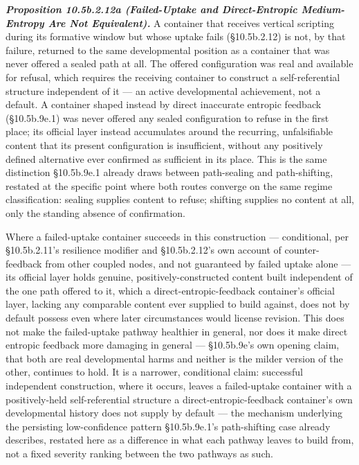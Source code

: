 \documentclass[
]{article}
\begin{document}
\emph{\textbf{Proposition 10.5b.2.12a (Failed-Uptake and Direct-Entropic
Medium-Entropy Are Not Equivalent).}} A container that receives vertical
scripting during its formative window but whose uptake fails
(§10.5b.2.12) is not, by that failure, returned to the same
developmental position as a container that was never offered a sealed
path at all. The offered configuration was real and available for
refusal, which requires the receiving container to construct a
self-referential structure independent of it --- an active developmental
achievement, not a default. A container shaped instead by direct
inaccurate entropic feedback (§10.5b.9e.1) was never offered any sealed
configuration to refuse in the first place; its official layer instead
accumulates around the recurring, unfalsifiable content that its present
configuration is insufficient, without any positively defined
alternative ever confirmed as sufficient in its place. This is the same
distinction §10.5b.9e.1 already draws between path-sealing and
path-shifting, restated at the specific point where both routes converge
on the same regime classification: sealing supplies content to refuse;
shifting supplies no content at all, only the standing absence of
confirmation.

Where a failed-uptake container succeeds in this construction ---
conditional, per §10.5b.2.11's resilience modifier and §10.5b.2.12's own
account of counter-feedback from other coupled nodes, and not guaranteed
by failed uptake alone --- its official layer holds genuine,
positively-constructed content built independent of the one path offered
to it, which a direct-entropic-feedback container's official layer,
lacking any comparable content ever supplied to build against, does not
by default possess even where later circumstances would license
revision. This does not make the failed-uptake pathway healthier in
general, nor does it make direct entropic feedback more damaging in
general --- §10.5b.9e's own opening claim, that both are real
developmental harms and neither is the milder version of the other,
continues to hold. It is a narrower, conditional claim: successful
independent construction, where it occurs, leaves a failed-uptake
container with a positively-held self-referential structure a
direct-entropic-feedback container's own developmental history does not
supply by default --- the mechanism underlying the persisting
low-confidence pattern §10.5b.9e.1's path-shifting case already
describes, restated here as a difference in what each pathway leaves to
build from, not a fixed severity ranking between the two pathways as
such.
\end{document}
